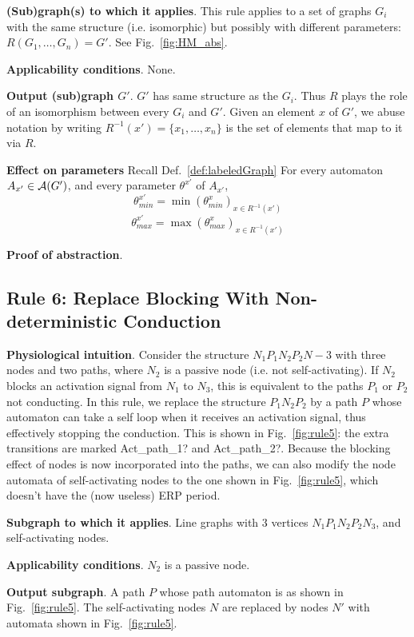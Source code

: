 \textbf{(Sub)graph(s) to which it applies}.
This rule applies to a set of graphs $G_i$ with the same structure (i.e. isomorphic) but possibly with different parameters: $R(G_1,\ldots,G_n) = G'$.
See Fig.~\ref{fig:HM_abs}.

\textbf{Applicability conditions}.
None.

\textbf{Output (sub)graph $G'$}.
$G'$ has same structure as the $G_i$.
Thus $R$ plays the role of an isomorphism between every $G_i$ and $G'$.
Given an element $x$ of $G'$, we abuse notation by writing $R^{-1}(x') = \{x_1,\dots,x_n\}$ is the set of elements that map to it via $R$.

\textbf{Effect on parameters}
Recall Def.~\ref{def:labeledGraph}
For every automaton $A_{x'} \in \mathcal{A}(G')$, and every parameter $\theta^{x'}$ of $A_{x'}$, 
\[\theta_{min}^{x'} = \min(\theta^x_{min})_{x \in R^{-1}(x') }\]
\[\theta_{max}^{x'} = \max(\theta^x_{max})_{x \in R^{-1}(x') }\]

\textbf{Proof of abstraction}.

%

\subsection{Rule 6: Replace Blocking With Non-deterministic Conduction}
\textbf{Physiological intuition}. 
Consider the structure $N_1 P_1 N_2 P_2 N-3$ with three nodes and two paths, where $N_2$ is a passive node (i.e. not self-activating).
If $N_2$ blocks an activation signal from $N_1$ to $N_3$, this is equivalent to the paths $P_1$ or $P_2$ not conducting.
In this rule, we replace the structure $P_1 N_2 P_2$ by a path $P$ whose automaton can take a self loop when it receives an activation signal, thus effectively stopping the conduction. 
This is shown in Fig.~\ref{fig:rule5}: the extra transitions are marked {\quattrofont Act\_path\_1?} and {\quattrofont Act\_path\_2?}.
Because the blocking effect of nodes is now incorporated into the paths, we can also modify the node automata of self-activating nodes to the one shown in Fig.~\ref{fig:rule5}, which doesn't have the (now useless) ERP period.

\textbf{Subgraph to which it applies}.
Line graphs with 3 vertices $N_1 P_1 N_2 P_2 N_3$, and self-activating nodes.

\textbf{Applicability conditions}.
$N_2$ is a passive node.

\textbf{Output subgraph}.
A path $P$ whose path automaton is as shown in Fig.~\ref{fig:rule5}.
The self-activating nodes $N$ are replaced by nodes $N'$ with automata shown in Fig.~\ref{fig:rule5}.

